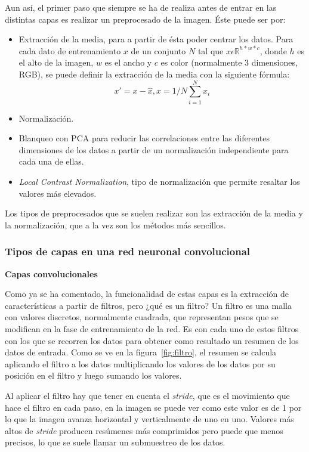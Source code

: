 Aun así, el primer paso que siempre se ha de realiza antes de entrar en las distintas capas es realizar un preprocesado de la imagen. Éste puede ser por:
\begin{itemize}
	\item Extracción de la media, para a partir de ésta poder centrar los datos. Para cada dato de entrenamiento $x$ de un conjunto $N$ tal que $x \epsilon \mathbb{R}^{h*w*c}$, donde $h$ es el alto de la imagen, $w$ es el ancho y $c$ es color (normalmente 3 dimensiones, RGB), se puede definir la extracción de la media con la siguiente fórmula:
	\begin{equation}
	x'=x-\widehat{x}, \widehat{x}=1/N\sum_{i=1}^{N}x_i
	\end{equation}
	\item Normalización.
	\item Blanqueo con PCA para reducir las correlaciones entre las diferentes dimensiones de los datos a partir de un normalización independiente para cada una de ellas.
	\item \textit{Local Contrast Normalization}, tipo de normalización que permite resaltar los valores más elevados.
\end{itemize}

Los tipos de preprocesados que se suelen realizar son las extracción de la media y la normalización, que a la vez son los métodos más sencillos.

\subsubsection{Tipos de capas en una red neuronal convolucional}
\textbf{Capas convolucionales}

Como ya se ha comentado, la funcionalidad de estas capas es la extracción de características a partir de filtros, pero ¿qué es un filtro? Un filtro es una malla con valores discretos, normalmente cuadrada, que representan pesos que se modifican en la fase de entrenamiento de la red. Es con cada uno de estos filtros con los que se recorren los datos para obtener como resultado un resumen de los datos de entrada. Como se ve en la figura~\ref{fig:filtro}, el resumen se calcula aplicando el filtro a los datos multiplicando los valores de los datos por su posición en el filtro y luego sumando los valores.

Al aplicar el filtro hay que tener en cuenta el \textit{stride}, que es el movimiento que hace el filtro en cada paso, en la imagen se puede ver como este valor es de 1 por lo que la imagen avanza horizontal y verticalmente de uno en uno. Valores más altos de \textit{stride} producen resúmenes más comprimidos pero puede que menos precisos, lo que se suele llamar un submuestreo de los datos.

